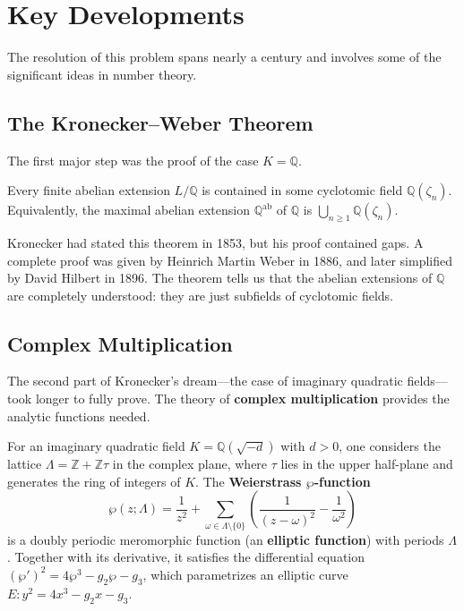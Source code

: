 \section{Key Developments}

The resolution of this problem spans nearly a century and involves some of the significant ideas in number theory.

\subsection{The Kronecker--Weber Theorem}

The first major step was the proof of the case $K = \mathbb{Q}$.

\begin{theorem}\label{thm:kronecker-weber}
Every finite abelian extension $L/\mathbb{Q}$ is contained in some cyclotomic field $\mathbb{Q}(\zeta_n)$. Equivalently, the maximal abelian extension $\mathbb{Q}^{\text{ab}}$ of $\mathbb{Q}$ is $\bigcup_{n \geq 1} \mathbb{Q}(\zeta_n)$.
\end{theorem}

Kronecker had stated this theorem in 1853, but his proof contained gaps. A complete proof was given by Heinrich Martin Weber in 1886, and later simplified by David Hilbert in 1896. The theorem tells us that the abelian extensions of $\mathbb{Q}$ are completely understood: they are just subfields of cyclotomic fields.

\subsection{Complex Multiplication}

The second part of Kronecker's dream---the case of imaginary quadratic fields---took longer to fully prove. The theory of \textbf{complex multiplication} provides the analytic functions needed.

For an imaginary quadratic field $K = \mathbb{Q}(\sqrt{-d})$ with $d > 0$, one considers the lattice $\Lambda = \mathbb{Z} + \mathbb{Z}\tau$ in the complex plane, where $\tau$ lies in the upper half-plane and generates the ring of integers of $K$. The \textbf{Weierstrass $\wp$-function}
\[
\wp(z; \Lambda) = \frac{1}{z^2} + \sum_{\omega \in \Lambda \setminus \{0\}} \left(\frac{1}{(z - \omega)^2} - \frac{1}{\omega^2}\right)
\]
is a doubly periodic meromorphic function (an \textbf{elliptic function}) with periods $\Lambda$. Together with its derivative, it satisfies the differential equation $(\wp')^2 = 4\wp^3 - g_2\wp - g_3$, which parametrizes an elliptic curve $E: y^2 = 4x^3 - g_2 x - g_3$.

